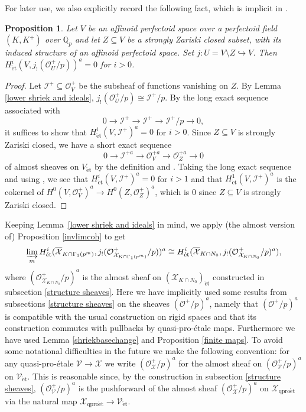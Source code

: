 \documentclass{amsart}
\newtheorem{prop}[subsubsection]{Proposition}
\theoremstyle{remark}
\numberwithin{equation}{subsection}
\newcommand{\Q}{\QQ}
\newcommand{\QQ}{{\mathbb Q}}
\newcommand{\cI}{{\mathcal I}}
\newcommand{\cO}{{\mathcal O}}
\newcommand{\cV}{{\mathcal V}}
\newcommand{\cX}{{\mathcal X}}
\newcommand{\Qp}{\Q_p}
\newcommand{\et}{\mathrm{\acute{e}t}}
\newcommand{\ocX}{\overline{\mathcal{X}}}
\newcommand{\qp}{\mathrm{qpro\acute{e}t}}
\newcommand{\sub}{\subseteq}
\renewcommand{\(}{\left(}
\renewcommand{\)}{\right)}
\begin{document}
\noindent For later use, we also explicitly record the following fact, which is implicit in \cite[\S 4.1]{scholze-galois}.

\begin{prop}\label{strongly Zariski closed vanishing}
Let $V$ be an affinoid perfectoid space over a perfectoid field $(K,K^{+})$ over $\Qp$ and let $Z\sub V$ be a strongly Zariski closed subset, with its induced structure of an affinoid perfectoid space. Set $j \colon U=V\setminus Z \hookrightarrow V$. Then $H^{i}_{\et}(V,j_{!}(\cO_{U}^{+}/p))^{a}=0$ for $i>0$.
\end{prop} 

\begin{proof}
Let $\cI^{+}\sub \cO_{V}^{+}$ be the subsheaf of functions vanishing on $Z$. By Lemma \ref{lower shriek and ideals}, $j_{!}(\cO_{U}^{+}/p)\cong \cI^{+}/p$. By the long exact sequence associated with 
$$0 \to \cI^{+} \to \cI^{+} \to \cI^{+}/p \to 0,$$
it suffices to show that $H^{i}_{\et}(V,\cI^{+})^{a}=0$ for $i>0$. Since $Z\sub V$ is strongly Zariski closed, we have a short exact sequence
$$ 0 \to \cI^{+a} \to \cO^{+a}_{V} \to \cO^{+a}_{Z} \to 0 $$
of almost sheaves on $V_{\et}$ by the definition and \cite[Lemma 2.2.9]{scholze-galois}. Taking the long exact sequence and using \cite[Proposition 7.13]{scholze-perfectoid}, we see that $H^{i}_{\et}(V,\cI^{+})^{a}=0$ for $i>1$ and that $H^{1}_{\et}(V,\cI^{+})^{a}$ is the cokernel of $H^{0}(V,\cO^{+}_{V})^{a} \to H^{0}(Z,\cO^{+}_{Z})^{a}$, which is $0$ since $Z\sub V$ is strongly Zariski closed. 
\end{proof}

Keeping Lemma~\ref{lower shriek and ideals} in mind, we apply (the almost version of) Proposition \ref{invlimcoh} to get
\[
  \varinjlim_{m} H^{i}_{\et}(\ocX_{K \cap \Gamma_1(p^m)},j_{!}(\cO_{\cX_{K \cap \Gamma_1(p^m)}}^{+}/p))^{a} \cong H^{i}_{\et}(\ocX_{K \cap N_{0}},j_{!}(\cO_{\cX_{K \cap N_{0}}}^{+}/p)^{a}), 
\]
where $(\cO_{\cX_{K \cap N_{0}}}^{+}/p)^{a}$ is the almost sheaf on $(\cX_{K \cap N_{0}})_{\et}$ constructed in subsection \ref{structure sheaves}. Here we have implicitly used some results from subsections  \ref{structure sheaves} on the sheaves $(\cO^{+}/p)^{a}$, namely that $(\cO^{+}/p)^{a}$ is compatible with the usual construction on rigid spaces and that its construction commutes with pullbacks by quasi-pro-\'etale maps. Furthermore we have used Lemma \ref{shriekbasechange} and Proposition \ref{finite maps}. To avoid some notational difficulties in the future we make the following convention: for any quasi-pro-\'etale $\cV \to \cX$ we write $(\cO_{\cX}^{+}/p)^{a}$ for the almost sheaf on $(\cO_{\cV}^{+}/p)^{a}$ on $\cV_{\et}$.
This is reasonable since, by the construction in subsection \ref{structure sheaves}, $(\cO_{\cV}^{+}/p)^{a}$ is the pushforward of the almost sheaf $(\cO_{\cX}^{+}/p)^{a}$ on $\cX_{\qp}$ via the natural map $\cX_{\qp} \to \cV_{\et}$.
\end{document}

